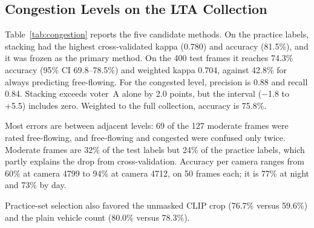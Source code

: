 \subsection{Congestion Levels on the LTA Collection}\label{sec:results-congestion}

Table~\ref{tab:congestion} reports the five candidate methods. On the practice
labels, stacking had the highest cross-validated kappa (0.780) and accuracy
(81.5\%), and it was frozen as the primary method. On the 400 test frames it
reaches 74.3\% accuracy (95\% CI 69.8--78.5\%) and weighted kappa 0.704,
against 42.8\% for always predicting free-flowing. For the congested level,
precision is 0.88 and recall 0.84. Stacking exceeds voter~A alone by 2.0 points,
but the interval (−1.8 to +5.5) includes zero. Weighted to the full
collection, accuracy is 75.8\%.

Most errors are between adjacent levels: 69 of the 127 moderate frames were
rated free-flowing, and free-flowing and congested were confused only twice.
Moderate frames are 32\% of the test labels but 24\% of the practice labels,
which partly explains the drop from cross-validation. Accuracy per camera ranges
from 60\% at camera 4799 to 94\% at camera 4712, on 50 frames each; it is 77\%
at night and 73\% by day.

Practice-set selection also favored the unmasked CLIP crop (76.7\% versus
59.6\%) and the plain vehicle count (80.0\% versus 78.3\%).

